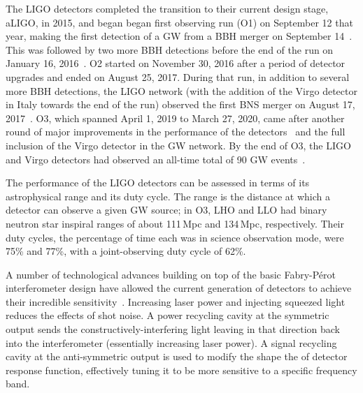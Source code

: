 The LIGO detectors completed the transition to their current design stage, \ac{aLIGO}, in 2015, and began began first observing run (\acs{O1}) on September 12 that year, making the first detection of a \ac{GW} from a \ac{BBH} merger on September 14~\citep{gw150914}.
This was followed by two more \ac{BBH} detections before the end of the run on January 16, 2016~\citep{gwtc1}.
\Ac{O2} started on November 30, 2016 after a period of detector upgrades and ended on August 25, 2017.
During that run, in addition to several more \ac{BBH} detections, the \ac{LIGO} network (with the addition of the Virgo detector in Italy towards the end of the run) observed the first \ac{BNS} merger on August 17, 2017~\citep{gw170817}.
\Ac{O3}, which spanned April 1, 2019 to March 27, 2020, came after another round of major improvements in the performance of the detectors~\citep{Buikema_2020} and the full inclusion of the Virgo detector in the \ac{GW} network.
By the end of O3, the LIGO and Virgo detectors had observed an all-time total of 90 GW events~\citep{gwtc2,gwtc3}.

The performance of the LIGO detectors can be assessed in terms of its astrophysical range and its duty cycle.
The range is the distance at which a detector can observe a given GW source; in O3, LHO and LLO had binary neutron star inspiral ranges of about 111\,Mpc and 134\,Mpc, respectively.
Their duty cycles, the percentage of time each was in science observation mode, were 75\% and 77\%, with a joint-observing duty cycle of 62\%.

A number of technological advances building on top of the basic Fabry-P\'erot interferometer design have allowed the current generation of detectors to achieve their incredible sensitivity~\citep{aLIGO_design}.
Increasing laser power and injecting squeezed light reduces the effects of shot noise.
A power recycling cavity at the symmetric output sends the constructively-interfering light leaving in that direction back into the interferometer (essentially increasing laser power).
A signal recycling cavity at the anti-symmetric output is used to modify the shape the of detector response function, effectively tuning it to be more sensitive to a specific frequency band.

